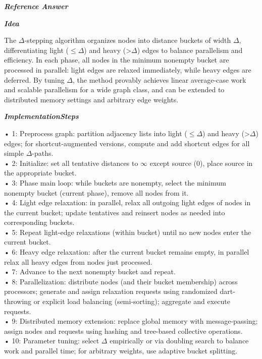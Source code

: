 \begin{tcolorbox}[
    breakable,
    title={Example of Idea Generation in Math},
    colback=LighterGray,
    colframe=DeepPurple,
    colbacktitle=DeepPurple,
    coltitle=White,
]
\textbf{\emph{\textcolor{DeepPurple}{Reference Answer}}}

\textbf{\emph{\textcolor{CaseOrange}{Idea}}}

The $\Delta$-stepping algorithm organizes nodes into distance buckets of width $\Delta$, differentiating light
($\leq\Delta$) and heavy (>$\Delta$) edges to balance parallelism and efficiency. In each phase, all nodes in the
minimum nonempty bucket are processed in parallel: light edges are relaxed immediately, while heavy
edges are deferred. By tuning $\Delta$, the method provably achieves linear average-case work and scalable
parallelism for a wide graph class, and can be extended to distributed memory settings and arbitrary
edge weights.

\textbf{\emph{\textcolor{CaseOrange}{ImplementationSteps}}}

• 1: Preprocess graph: partition adjacency lists into light ($\leq\Delta$) and heavy (>$\Delta$) edges; for shortcut-augmented versions, compute and add shortcut edges for all simple $\Delta$-paths. \\
• 2: Initialize: set all tentative distances to $\infty$ except source (0), place source in the appropriate bucket. \\
• 3: Phase main loop: while buckets are nonempty, select the minimum nonempty bucket (current phase), remove all nodes from it. \\
• 4: Light edge relaxation: in parallel, relax all outgoing light edges of nodes in the current bucket; update tentatives and reinsert nodes as needed into corresponding buckets. \\
• 5: Repeat light-edge relaxations (within bucket) until no new nodes enter the current bucket. \\
• 6: Heavy edge relaxation: after the current bucket remains empty, in parallel relax all heavy edges from nodes just processed. \\
• 7: Advance to the next nonempty bucket and repeat. \\
• 8: Parallelization: distribute nodes (and their bucket membership) across processors; generate and assign relaxation requests using randomized dart-throwing or explicit load balancing (semi-sorting); aggregate and execute requests. \\
• 9: Distributed memory extension: replace global memory with message-passing; assign nodes and requests using hashing and tree-based collective operations. \\
• 10: Parameter tuning: select $\Delta$ empirically or via doubling search to balance work and parallel time; for arbitrary weights, use adaptive bucket splitting. 


\end{tcolorbox}
